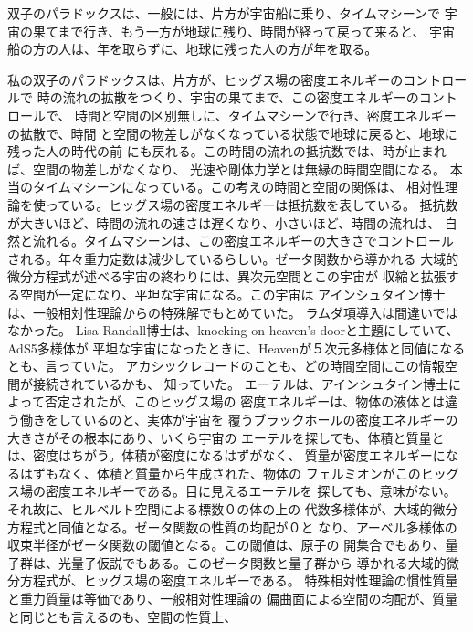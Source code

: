 \documentclass{jsarticle}
\begin{document}
\title{}
\author{}
\date{}
\maketitle

  双子のパラドックスは、一般には、片方が宇宙船に乗り、タイムマシーンで
宇宙の果てまで行き、もう一方が地球に残り、時間が経って戻って来ると、
宇宙船の方の人は、年を取らずに、地球に残った人の方が年を取る。

  私の双子のパラドックスは、片方が、ヒッグス場の密度エネルギーのコントロールで
時の流れの拡散をつくり、宇宙の果てまで、この密度エネルギーのコントロールで、
時間と空間の区別無しに、タイムマシーンで行き、密度エネルギーの拡散で、時間
と空間の物差しがなくなっている状態で地球に戻ると、地球に残った人の時代の前
にも戻れる。この時間の流れの抵抗数では、時が止まれば、空間の物差しがなくなり、
光速や剛体力学とは無縁の時間空間になる。
本当のタイムマシーンになっている。この考えの時間と空間の関係は、
相対性理論を使っている。ヒッグス場の密度エネルギーは抵抗数を表している。
抵抗数が大きいほど、時間の流れの速さは遅くなり、小さいほど、時間の流れは、
自然と流れる。タイムマシーンは、この密度エネルギーの大きさでコントロール
される。年々重力定数は減少しているらしい。ゼータ関数から導かれる
大域的微分方程式が述べる宇宙の終わりには、異次元空間とこの宇宙が
収縮と拡張する空間が一定になり、平坦な宇宙になる。この宇宙は
アインシュタイン博士は、一般相対性理論からの特殊解でもとめていた。
ラムダ項導入は間違いではなかった。
Lisa Randall博士は、knocking on heaven's doorと主題にしていて、AdS5多様体が
平坦な宇宙になったときに、Heavenが５次元多様体と同値になるとも、言っていた。
アカシックレコードのことも、どの時間空間にこの情報空間が接続されているかも、
知っていた。
エーテルは、アインシュタイン博士によって否定されたが、このヒッグス場の
密度エネルギーは、物体の液体とは違う働きをしているのと、実体が宇宙を
覆うブラックホールの密度エネルギーの大きさがその根本にあり、いくら宇宙の
エーテルを探しても、体積と質量とは、密度はちがう。体積が密度になるはずがなく、
質量が密度エネルギーになるはずもなく、体積と質量から生成された、物体の
フェルミオンがこのヒッグス場の密度エネルギーである。目に見えるエーテルを
探しても、意味がない。それ故に、ヒルベルト空間による標数０の体の上の
代数多様体が、大域的微分方程式と同値となる。ゼータ関数の性質の均配が０と
なり、アーベル多様体の収束半径がゼータ関数の閾値となる。この閾値は、原子の
開集合でもあり、量子群は、光量子仮説でもある。このゼータ関数と量子群から
導かれる大域的微分方程式が、ヒッグス場の密度エネルギーである。
特殊相対性理論の慣性質量と重力質量は等価であり、一般相対性理論の
偏曲面による空間の均配が、質量と同じとも言えるのも、空間の性質上、
\end{document}
